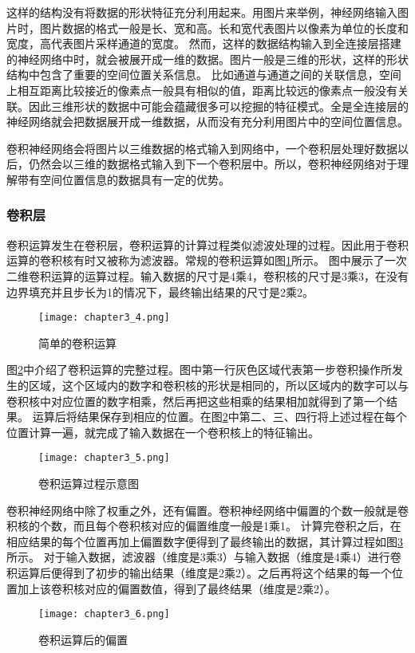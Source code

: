 这样的结构没有将数据的形状特征充分利用起来。用图片来举例，神经网络输入图片时，图片数据的格式一般是长、宽和高。长和宽代表图片以像素为单位的长度和宽度，高代表图片采样通道的宽度。
然而，这样的数据结构输入到全连接层搭建的神经网络中时，就会被展开成一维的数据。图片一般是三维的形状，这样的形状结构中包含了重要的空间位置关系信息。
比如通道与通道之间的关联信息，空间上相互距离比较接近的像素点一般具有相似的值，距离比较远的像素点一般没有关联。因此三维形状的数据中可能会蕴藏很多可以挖掘的特征模式。全是全连接层的神经网络就会把数据展开成一维数据，从而没有充分利用图片中的空间位置信息。

卷积神经网络会将图片以三维数据的格式输入到网络中，一个卷积层处理好数据以后，仍然会以三维的数据格式输入到下一个卷积层中。所以，卷积神经网络对于理解带有空间位置信息的数据具有一定的优势。

\subsubsection{卷积层}
卷积运算发生在卷积层，卷积运算的计算过程类似滤波处理的过程。因此用于卷积运算的卷积核有时又被称为滤波器。常规的卷积运算如图\ref{fig:chapter3_4}所示。
图中展示了一次二维卷积运算的运算过程。输入数据的尺寸是4乘4，卷积核的尺寸是3乘3，在没有边界填充并且步长为1的情况下，最终输出结果的尺寸是2乘2。
\begin{figure}
    \centering
    \texttt{[image: chapter3\_4.png]}
    \caption{简单的卷积运算\cite{luyujie_216}}
    \label{fig:chapter3_4}
\end{figure}

图\ref{fig:chapter3_5}中介绍了卷积运算的完整过程。图中第一行灰色区域代表第一步卷积操作所发生的区域，这个区域内的数字和卷积核的形状是相同的，所以区域内的数字可以与卷积核中对应位置的数字相乘，然后再把这些相乘的结果相加就得到了第一个结果。
运算后将结果保存到相应的位置。在图\ref{fig:chapter3_5}中第二、三、四行将上述过程在每个位置计算一遍，就完成了输入数据在一个卷积核上的特征输出。
\begin{figure}
    \centering
    \texttt{[image: chapter3\_5.png]}
    \caption{卷积运算过程示意图\cite{luyujie_216}}
    \label{fig:chapter3_5}
\end{figure}

卷积神经网络中除了权重之外，还有偏置。卷积神经网络中偏置的个数一般就是卷积核的个数，而且每个卷积核对应的偏置维度一般是1乘1。
计算完卷积之后，在相应结果的每个位置再加上偏置数字便得到了最终输出的数据，其计算过程如图\ref{fig:chapter3_6}所示。
对于输入数据，滤波器（维度是3乘3）与输入数据（维度是4乘4）进行卷积运算后便得到了初步的输出结果（维度是2乘2）。之后再将这个结果的每一个位置加上该卷积核对应的偏置数值，得到了最终结果（维度是2乘2）。
\begin{figure}
    \centering
    \texttt{[image: chapter3\_6.png]}
    \caption{卷积运算后的偏置\cite{luyujie_216}}
    \label{fig:chapter3_6}
\end{figure}


